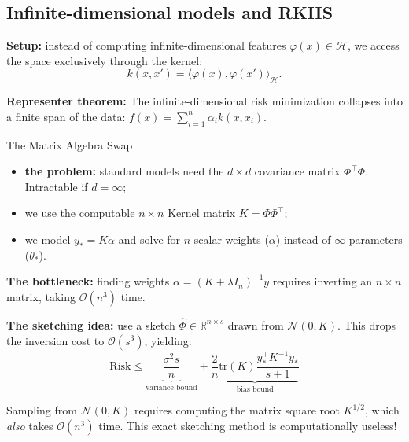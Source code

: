 \documentclass[
11pt,notheorems,hyperref={pdfauthor=whatever}
]{beamer}
\begin{document}
\subsection{Infinite-dimensional models and RKHS}
\begin{frame}
    \textbf{Setup:} instead of computing infinite-dimensional features \(\varphi(x) \in \mathcal{H}\), we access the space exclusively through the kernel: 
    \[ k(x, x') = \langle \varphi(x), \varphi(x') \rangle_{\mathcal{H}}. \]
    
    \vspace{0.25em}
    \textbf{Representer theorem:} 
    The infinite-dimensional risk minimization collapses into a finite span of the data: \(f(x) = \sum_{i=1}^n \alpha_i k(x, x_i)\).

    \vspace{0.5em}
    \begin{block}{The Matrix Algebra Swap}
        \begin{itemize}
            \item \alert{\textbf{the problem:}} standard models need the \(d \times d\) covariance matrix \(\Phi^\top\Phi\). Intractable if \(d = \infty\);
            \item {} we use the computable \(n \times n\) Kernel matrix \(K = \Phi\Phi^\top\);
            \item {} we model \(y_* = K\alpha\) and solve for \(n\) scalar weights (\(\alpha\)) instead of \(\infty\) parameters (\(\theta_*\)).
        \end{itemize}
    \end{block}
\end{frame}

\begin{frame}
    \textbf{The bottleneck:} 
    finding weights \(\alpha = (K + \lambda I_n)^{-1}y\) requires inverting an \(n \times n\) matrix, taking \alert{\textbf{\(\mathcal{O}(n^3)\)}} time.

    \vspace{0.5em}
    \textbf{The sketching idea:} 
    use a sketch \(\hat{\Phi} \in \mathbb{R}^{n \times s}\) drawn from \(\mathcal{N}(0, K)\). This drops the inversion cost to \(\mathcal{O}(s^3)\), yielding:
    \[
        \text{Risk} \le \underbrace{\frac{\sigma^2 s}{n}}_{\text{variance bound}} + \underbrace{\frac{2}{n}\text{tr}(K)\frac{y_*^\top K^{-1} y_*}{s+1}}_{\text{bias bound}}
    \]

    \vspace{0.5em}
    \begin{block}{}
        Sampling from \(\mathcal{N}(0, K)\) requires computing the matrix square root \(K^{1/2}\), which \textit{also} takes \alert{\textbf{\(\mathcal{O}(n^3)\)}} time. This exact sketching method is computationally useless!
    \end{block}
\end{frame}
\end{document}
